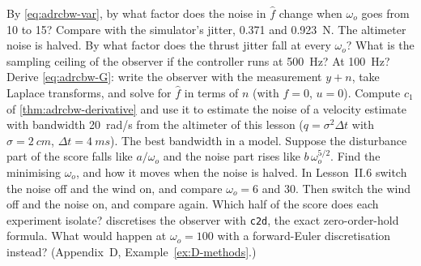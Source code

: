 \begin{exercises}
\exercise[1] By \cref{eq:adrcbw-var}, by what factor does the noise in $\hat f$ change when $\omega_o$ goes from 10 to 15? Compare with the simulator's jitter, 0.371 and \SI{0.923}{N}.
\exercise[1] The altimeter noise is halved. By what factor does the thrust jitter fall at every $\omega_o$?
\exercise[1] What is the sampling ceiling of the observer if the controller runs at \SI{500}{Hz}? At \SI{100}{Hz}?
\exercise[2] Derive \cref{eq:adrcbw-G}: write the observer with the measurement $y + n$, take Laplace transforms, and solve for $\hat f$ in terms of $n$ (with $f = 0$, $u = 0$).
\exercise[2] Compute $c_1$ of \cref{thm:adrcbw-derivative} and use it to estimate the noise of a velocity estimate with bandwidth \SI{20}{rad/s} from the altimeter of this lesson ($q = \sigma^2\Delta t$ with $\sigma = \SI{2}{cm}$, $\Delta t = \SI{4}{ms}$).
\exercise[2] The best bandwidth in a model. Suppose the disturbance part of the score falls like $a/\omega_o$ and the noise part rises like $b\,\omega_o^{5/2}$. Find the minimising $\omega_o$, and how it moves when the noise is halved.
\exercise[2] In Lesson~II.6 switch the noise off and the wind on, and compare $\omega_o = 6$ and 30. Then switch the wind off and the noise on, and compare again. Which half of the score does each experiment isolate?
\exercise[2]  discretises the observer with \texttt{c2d}, the exact zero-order-hold formula. What would happen at $\omega_o = 100$ with a forward-Euler discretisation instead? (Appendix~D, Example~\ref{ex:D-methods}.)

\end{exercises}

